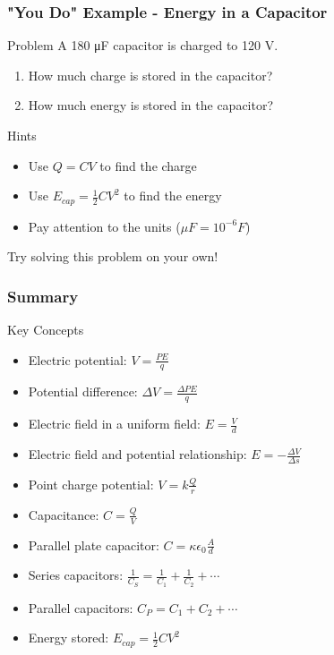 \documentclass{beamer}
\begin{document}
\begin{frame}
    \frametitle{"You Do" Example - Energy in a Capacitor}
    
    \begin{block}{Problem}
        A 180 μF capacitor is charged to 120 V. 
        \begin{enumerate}
            \item How much charge is stored in the capacitor?
            \item How much energy is stored in the capacitor?
        \end{enumerate}
    \end{block}
    
    \begin{block}{Hints}
        \begin{itemize}
            \item Use $Q = CV$ to find the charge
            \item Use $E_{cap} = \frac{1}{2}CV^2$ to find the energy
            \item Pay attention to the units ($μF = 10^{-6} F$)
        \end{itemize}
    \end{block}
    
    Try solving this problem on your own!
\end{frame}

\begin{frame}
    \frametitle{Summary}
    
    \begin{block}{Key Concepts}
        \begin{itemize}
            \item Electric potential: $V = \frac{PE}{q}$
            \item Potential difference: $\Delta V = \frac{\Delta PE}{q}$
            \item Electric field in a uniform field: $E = \frac{V}{d}$
            \item Electric field and potential relationship: $E = -\frac{\Delta V}{\Delta s}$
            \item Point charge potential: $V = k\frac{Q}{r}$
            \item Capacitance: $C = \frac{Q}{V}$
            \item Parallel plate capacitor: $C = \kappa\epsilon_0 \frac{A}{d}$
            \item Series capacitors: $\frac{1}{C_S} = \frac{1}{C_1} + \frac{1}{C_2} + \cdots$
            \item Parallel capacitors: $C_P = C_1 + C_2 + \cdots$
            \item Energy stored: $E_{cap} = \frac{1}{2}CV^2$
        \end{itemize}
    \end{block}
\end{frame}
\end{document}
